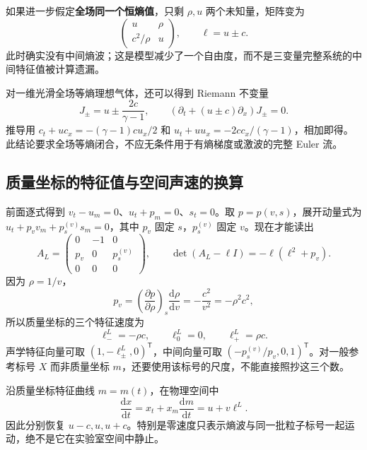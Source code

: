 如果进一步假定\textbf{全场同一个恒熵值}，只剩 $\rho,u$ 两个未知量，矩阵变为
\begin{equation}
 \begin{pmatrix}u&\rho\\c^2/\rho&u\end{pmatrix},
 \qquad\ell=u\pm c.
\end{equation}
此时确实没有中间熵波；这是模型减少了一个自由度，而不是三变量完整系统的中间特征值被计算遗漏。

对一维光滑全场等熵理想气体，还可以得到 Riemann 不变量
\begin{equation}
 J_\pm=u\pm\frac{2c}{\gamma-1},\qquad
 (\partial_t+(u\pm c)\partial_x)J_\pm=0.
\end{equation}
推导用 $c_t+uc_x=-(\gamma-1)cu_x/2$ 和 $u_t+uu_x=-2cc_x/(\gamma-1)$，相加即得。此结论要求全场等熵闭合，不应无条件用于有熵梯度或激波的完整 Euler 流。

\subsection{质量坐标的特征值与空间声速的换算}

前面逐式得到 $v_t-u_m=0$、$u_t+p_m=0$、$s_t=0$。取 $p=p(v,s)$，展开动量式为 $u_t+p_vv_m+p_s^{(v)}s_m=0$，其中 $p_v$ 固定 $s$，$p_s^{(v)}$ 固定 $v$。现在才能读出
\begin{equation}
 A_L=\begin{pmatrix}0&-1&0\\p_v&0&p_s^{(v)}\\0&0&0\end{pmatrix},
 \qquad\det(A_L-\ell I)=-\ell(\ell^2+p_v).
\end{equation}
因为 $\rho=1/v$，
\begin{equation}
 p_v=\left(\frac{\partial p}{\partial\rho}\right)_s\frac{\mathrm d\rho}{\mathrm dv}
 =-\frac{c^2}{v^2}=-\rho^2c^2,
\end{equation}
所以质量坐标的三个特征速度为
\begin{equation}
 \boxed{\ell_-^L=-\rho c,\qquad\ell_0^L=0,\qquad\ell_+^L=\rho c.}
 \label{eq:lagrangian-eigenvalues}
\end{equation}
声学特征向量可取 $(1,-\ell_\pm^L,0)^{\mathsf T}$，中间向量可取 $(-p_s^{(v)}/p_v,0,1)^{\mathsf T}$。对一般参考标号 $X$ 而非质量坐标 $m$，还要使用该标号的尺度，不能直接照抄这三个数。

沿质量坐标特征曲线 $m=m(t)$，在物理空间中
\begin{equation}
 \frac{\mathrm dx}{\mathrm dt}=x_t+x_m\frac{\mathrm dm}{\mathrm dt}
 =u+v\ell^L.
\end{equation}
因此分别恢复 $u-c,u,u+c$。特别是零速度只表示熵波与同一批粒子标号一起运动，绝不是它在实验室空间中静止。

